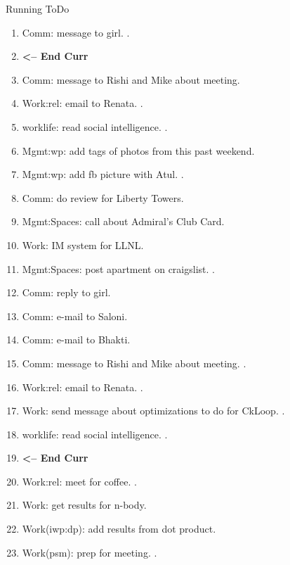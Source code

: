 \begin{columns}
\begin{column}{0.6\linewidth}
\begin{block}{Running ToDo}
\begin{enumerate}
      \item \tiny Comm: message to girl.  . 


          
        \item \tiny \textbf{ <-- End Curr }

      \item \tiny Comm: message to Rishi and Mike about meeting.
        \item \tiny Work:rel: email to Renata. . 
        \item \tiny worklife: read social intelligence. .  

      \item \tiny Mgmt:wp: add tags of photos from this past weekend.  
      \item \tiny Mgmt:wp: add fb picture with Atul. \dl{}.

        \item \tiny Comm: do review for Liberty Towers.

        \item \tiny Mgmt:Spaces: call about Admiral's Club Card.
        \item \tiny Work: IM system for LLNL.
        \item \tiny Mgmt:Spaces: post apartment on craigslist. .

        \item \tiny Comm: reply to girl.  

        \item \tiny Comm: e-mail to Saloni.
        \item \tiny Comm: e-mail to Bhakti. 
        \item \tiny Comm: message to Rishi and Mike about
          meeting. . 
        \item \tiny Work:rel: email to Renata. . 

        \item \tiny Work: send message about optimizations to do for
          CkLoop.  . 
        \item \tiny worklife: read social intelligence. . 

        \item \tiny \textbf{ <-- End Curr } 

        \item \tiny Work:rel: meet for coffee. . 
        \item \tiny Work: get results for n-body.
        \item \tiny Work(iwp:dp): add results from dot product.    
        \item \tiny Work(psm): prep for meeting. . 
        \end{enumerate}
      \end{block}
      

\end{column}
\end{columns}
